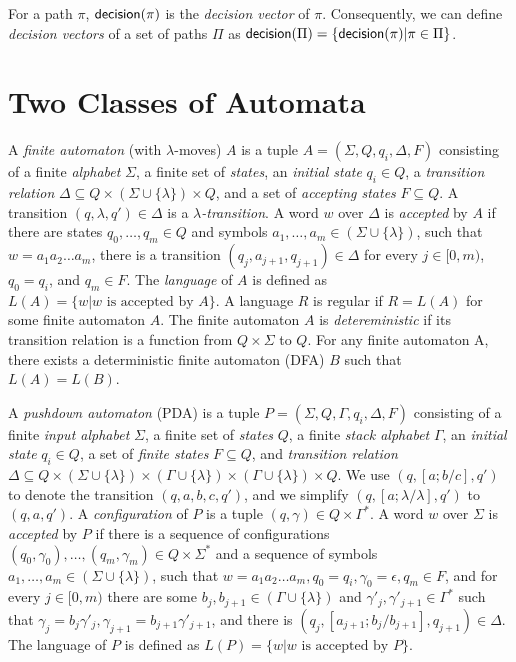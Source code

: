 For a path $\pi$, $\mathsf{decision}(\pi)$ is the \emph{decision vector} of $\pi$. Consequently, we can define \emph{decision vectors} of a set of paths $\Pi$ as $\mathsf{decision}(\Pi) = \{\mathsf{decision}(\pi) | \pi \in \Pi\}$.

\section{Two Classes of Automata}\label{sec:automata}

A \emph{finite automaton} (with $\lambda$-moves) $A$ is a tuple $A = (\Sigma, Q, q_i, \Delta, F)$ consisting of a finite \emph{alphabet} $\Sigma$, a finite set of \emph{states}, an \emph{initial state} $q_i \in Q$, a \emph{transition relation} $\Delta \subseteq Q \times (\Sigma \cup \{\lambda\}) \times Q$, and a set of \emph{accepting states} $F \subseteq Q$. A transition $(q, \lambda, q') \in \Delta$ is a \emph{$\lambda$-transition}. A word $w$ over $\Delta$ is \emph{accepted} by $A$ if there are states $q_0, \dots, q_m \in Q$ and symbols $a_1, \dots, a_m \in (\Sigma \cup \{\lambda\})$, such that $w = a_1a_2 \dots a_m$, there is a transition $(q_j, a_{j+1}, q_{j+1}) \in \Delta$ for every $j \in [0,m)$, $q_0 = q_i$, and $q_m \in F$. The \emph{language} of $A$ is defined as $L(A) = \{w|w \text{ is accepted by } A\} $. A language $R$ is regular if $R = L(A)$ for some finite automaton $A$. The finite automaton $A$ is \emph{detereministic} if its transition relation is a function from $Q \times \Sigma$ to $Q$. For any finite automaton A, there exists a deterministic finite automaton (DFA) $B$ such that $L(A) = L(B)$. 

A \emph{pushdown automaton} (PDA) is a tuple $P = (\Sigma, Q, \Gamma, q_i, \Delta, F)$ consisting of a finite \emph{input alphabet} $\Sigma$, a finite set of \emph{states} $Q$, a finite \emph{stack alphabet} $\Gamma$, an \emph{initial state} $q_i \in Q$, a set of \emph{finite states} $F \subseteq Q$, and \emph{transition relation} $\Delta \subseteq Q \times (\Sigma \cup \{\lambda\}) \times (\Gamma \cup \{\lambda\}) \times (\Gamma \cup \{\lambda\}) \times Q$. We use $(q, [a;b/c], q')$ to denote the transition $(q, a, b, c, q')$, and we simplify $(q, [a;\lambda/\lambda], q')$ to $(q, a, q')$. A \emph{configuration} of $P$ is a tuple $(q,\gamma) \in Q \times \Gamma^*$. A word $w$ over $\Sigma$ is \emph{accepted} by $P$ if there is a sequence of configurations $(q_0, \gamma_0), \dots, (q_m, \gamma_m) \in Q \times \Sigma^*$ and a sequence of symbols $a_1, \dots, a_m \in (\Sigma \cup \{\lambda\})$, such that $w=a_1a_2\dots a_m, q_0 = q_i, \gamma_0 = \epsilon, q_m \in F$, and for every $j \in [0,m)$ there are some $b_j, b_{j+1} \in (\Gamma \cup \{\lambda\})$ and $\gamma'_j, \gamma'_{j+1} \in \Gamma^*$ such that $\gamma_j = b_j\gamma'_j, \gamma_{j+1} = b_{j+1}\gamma'_{j+1}$, and there is $(q_j, [a_{j+1};b_j/b_{j+1}], q_{j+1}) \in \Delta$. The language of $P$ is defined as $L(P) = \{w | w \text{ is accepted by } P\}$.


